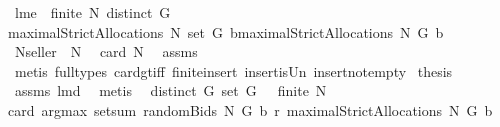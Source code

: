 \begin{isabellebody}
%
\endisatagproof
{\isafoldproof}%
%
\isadelimproof
\isanewline
%
\endisadelimproof
{}\isamarkupfalse%
\ lm{}{}e{\isacharcolon}\ \ {\isachardoublequoteopen}finite\ N{\isachardoublequoteclose}\ {\isachardoublequoteopen}distinct\ G{\isachardoublequoteclose}\ \isanewline
{\isachardoublequoteopen}maximalStrictAllocations{\isacharprime}\ N\ {\isacharparenleft}set\ G{\isacharparenright}\ b{\isacharequal}maximalStrictAllocations\ N\ G\ b{\isachardoublequoteclose}\ \isanewline
%
\isadelimproof
%
\endisadelimproof
%
\isatagproof
{}\isamarkupfalse%
\ {\isacharminus}\isanewline
{}\isamarkupfalse%
\ {\isacharquery}N{\isacharequal}{\isachardoublequoteopen}{\isacharbraceleft}seller{\isacharbraceright}\ {\isasymunion}\ N{\isachardoublequoteclose}\ \isanewline
{}\isamarkupfalse%
\ {\isachardoublequoteopen}card\ {\isacharquery}N{\isachargreater}{}{\isachardoublequoteclose}\ \isamarkupfalse%
\ assms{\isacharparenleft}{}{\isacharparenright}\ \isamarkupfalse%
\ {\isacharparenleft}metis\ {\isacharparenleft}full{\isacharunderscore}types{\isacharparenright}\ card{\isacharunderscore}gt{\isacharunderscore}{}{\isacharunderscore}iff\ finite{\isacharunderscore}insert\ insert{\isacharunderscore}is{\isacharunderscore}Un\ insert{\isacharunderscore}not{\isacharunderscore}empty{\isacharparenright}\isanewline
{}\isamarkupfalse%
\ {\isacharquery}thesis\ \isamarkupfalse%
\ assms{\isacharparenleft}{}{\isacharparenright}\ lm{}{}d\ \isamarkupfalse%
\ metis\isanewline
{}\isamarkupfalse%
%
\endisatagproof
{\isafoldproof}%
%
\isadelimproof
\isanewline
%
\endisadelimproof
{}\isamarkupfalse%
\ \ {\isachardoublequoteopen}distinct\ G{\isachardoublequoteclose}\ {\isachardoublequoteopen}set\ G\ {\isasymnoteq}\ {\isacharbraceleft}{\isacharbraceright}{\isachardoublequoteclose}\ {\isachardoublequoteopen}finite\ N{\isachardoublequoteclose}\ \ \isanewline
{\isachardoublequoteopen}{}{\isacharequal}card\ {\isacharparenleft}argmax\ {\isacharparenleft}setsum\ {\isacharparenleft}randomBids\ N\ G\ b\ r{\isacharparenright}{\isacharparenright}\ {\isacharparenleft}maximalStrictAllocations\ N\ G\ b{\isacharparenright}{\isacharparenright}{\isachardoublequoteclose}\isanewline
%
\isadelimproof
%
\endisadelimproof
%
\isatagproof
{}\isamarkupfalse%

\end{isabellebody}
